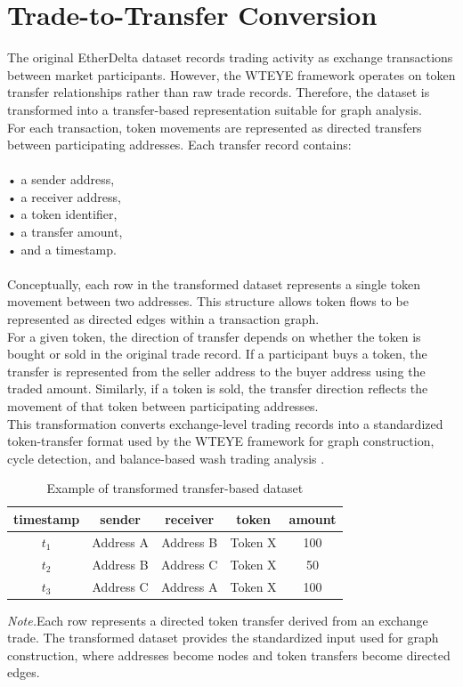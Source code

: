 \documentclass[language=english,thesis=bachelor,nosecondtitle,faculty=cb,onesided,13pt]{hsmw-thesis}
\begin{document}
	\section{Trade-to-Transfer Conversion}
The original EtherDelta dataset records trading activity as exchange transactions between market participants. However, the WTEYE framework operates on token transfer relationships rather than raw trade records. Therefore, the dataset is transformed into a transfer-based representation suitable for graph analysis.\\
For each transaction, token movements are represented as directed transfers between participating addresses. Each transfer record contains:\\
\\
• a sender address,\\
• a receiver address,\\
• a token identifier,\\
• a transfer amount,\\
• and a timestamp.\\
\\
Conceptually, each row in the transformed dataset represents a single token movement between two addresses. This structure allows token flows to be represented as directed edges within a transaction graph.\\
For a given token, the direction of transfer depends on whether the token is bought or sold in the original trade record. If a participant buys a token, the transfer is represented from the seller address to the buyer address using the traded amount. Similarly, if a token is sold, the transfer direction reflects the movement of that token between participating addresses.\\
This transformation converts exchange-level trading records into a standardized token-transfer format used by the WTEYE framework for graph construction, cycle detection, and balance-based wash trading analysis \cite{cui2023chain}.\\

\begin{table}[h!]
\centering
\begin{tabular}{ccccc}
	\hline
	\textbf{timestamp} & \textbf{sender} & \textbf{receiver} & \textbf{token} & \textbf{amount} \\ \hline
	$t_1$ & Address A & Address B & Token X & 100 \\ 
	$t_2$ & Address B & Address C & Token X & 50  \\ 
	$t_3$ & Address C & Address A & Token X & 100 \\ \hline
\end{tabular}
\caption{Example of transformed transfer-based dataset}
\label{table:transformed_dataset}
\end{table}
\textit{Note.}Each row represents a directed token transfer derived from an exchange trade. The transformed dataset provides the standardized input used for graph construction, where addresses become nodes and token transfers become directed edges.
\end{document}
